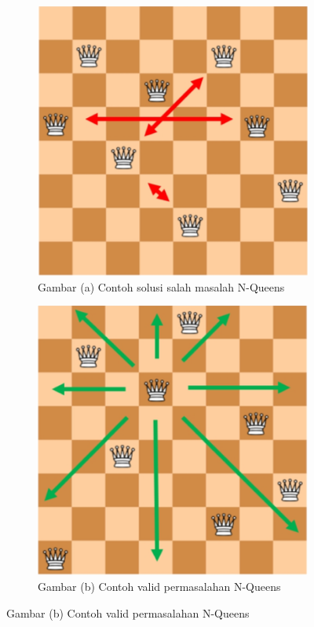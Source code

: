 \documentclass[a4paper,twoside]{article}
\begin{document}
	\begin{figure}[H]
		\centering
		
		\begin{subfigure}{0.35\textwidth}
			\centering
			\includegraphics[width=\linewidth]{images/N_queens_wrong.png}
			\caption*{Gambar \thefigure(a) Contoh solusi salah masalah N-Queens}
			\label{fig:NQ_wrong}
		\end{subfigure}
		\hspace{2cm}
		\begin{subfigure}{0.35\textwidth}
			\centering
			\includegraphics[width=\linewidth]{images/N_queens_correct.png}
			\caption*{Gambar \thefigure(b) Contoh valid permasalahan N-Queens}
			\label{fig:NQ_correct}
		\end{subfigure}
	\end{figure}
	
\end{document}
